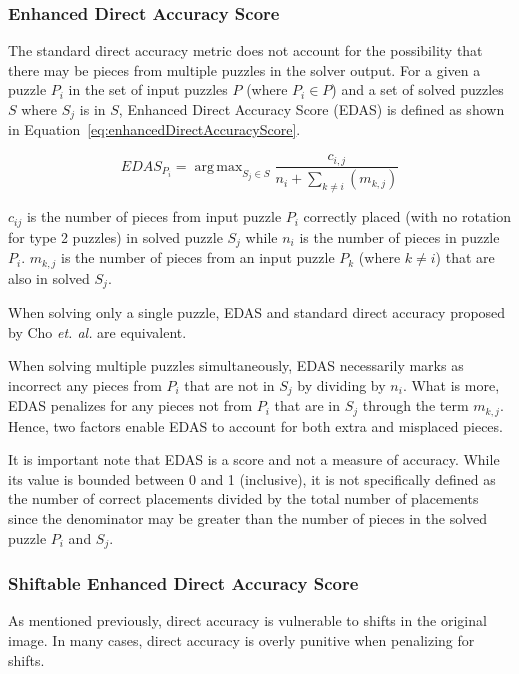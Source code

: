 \documentclass{report}
\DeclareMathOperator*{\argmax}{arg\,max} %
\begin{document}
\subsubsection{Enhanced Direct Accuracy Score}\label{sec:enhancedDirectAccuracyScore}

The standard direct accuracy metric does not account for the possibility that there may be pieces from multiple puzzles in the solver output.  For a given a puzzle $P_i$ in the set of input puzzles $P$ (where $P_i \in P$) and a set of solved puzzles $S$ where $S_j$ is in $S$, Enhanced Direct Accuracy Score (EDAS) is defined as shown in Equation~\ref{eq:enhancedDirectAccuracyScore}.

\begin{equation} \label{eq:enhancedDirectAccuracyScore}
EDAS_{P_i} = \argmax_{S_j \in S}\frac{c_{i,j}}{n_i + \sum_{k \ne i}(m_{k,j})}
\end{equation}

\noindent
$c_{ij}$ is the number of pieces from input puzzle $P_i$ correctly placed (with no rotation for type 2 puzzles) in solved puzzle $S_j$ while $n_i$ is the number of pieces in puzzle $P_i$. $m_{k,j}$ is the number of pieces from an input puzzle $P_k$ (where $k \ne i$) that are also in solved $S_j$.

When solving only a single puzzle, EDAS and standard direct accuracy proposed by Cho \textit{et. al.} are equivalent.  

When solving multiple puzzles simultaneously, EDAS necessarily marks as incorrect any pieces from $P_i$ that are not in $S_j$ by dividing by $n_i$.  What is more, EDAS penalizes for any pieces not from $P_i$ that are in $S_j$ through the term $m_{k,j}$.  Hence, two factors enable EDAS to account for both extra and misplaced pieces.

It is important note that EDAS is a score and not a measure of accuracy. While its value is bounded between 0 and 1 (inclusive), it is not specifically defined as the number of correct placements divided by the total number of placements since the denominator may be greater than the number of pieces in the solved puzzle $P_i$ and $S_j$.

\subsubsection{Shiftable Enhanced Direct Accuracy Score}\label{sec:shiftableEnhancedDirectAccuracy}

As mentioned previously, direct accuracy is vulnerable to shifts in the original image.  In many cases, direct accuracy is overly punitive when penalizing for shifts. 
\end{document}

